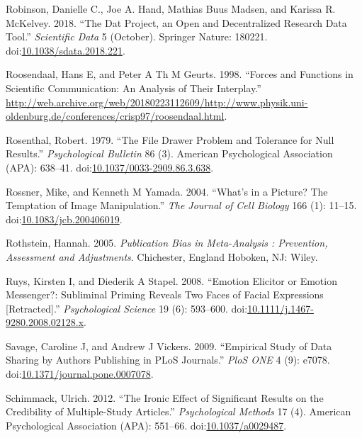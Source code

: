 \documentclass[a5paper]{book}
\begin{document}
\hypertarget{ref-doi:10.1038ux2fsdata.2018.221}{}
Robinson, Danielle C., Joe A. Hand, Mathias Buus Madsen, and Karissa R.
McKelvey. 2018. ``The Dat Project, an Open and Decentralized Research
Data Tool.'' \emph{Scientific Data} 5 (October). Springer Nature:
180221.
doi:\href{https://doi.org/10.1038/sdata.2018.221}{10.1038/sdata.2018.221}.

\hypertarget{ref-roosendaal1998}{}
Roosendaal, Hans E, and Peter A Th M Geurts. 1998. ``Forces and
Functions in Scientific Communication: An Analysis of Their Interplay.''
\url{http://web.archive.org/web/20180223112609/http://www.physik.uni-oldenburg.de/conferences/crisp97/roosendaal.html}.

\hypertarget{ref-doi:10.1037ux2f0033-2909.86.3.638}{}
Rosenthal, Robert. 1979. ``The File Drawer Problem and Tolerance for
Null Results.'' \emph{Psychological Bulletin} 86 (3). American
Psychological Association (APA): 638--41.
doi:\href{https://doi.org/10.1037/0033-2909.86.3.638}{10.1037/0033-2909.86.3.638}.

\hypertarget{ref-doi:10.1083ux2fjcb.200406019}{}
Rossner, Mike, and Kenneth M Yamada. 2004. ``What's in a Picture? The
Temptation of Image Manipulation.'' \emph{The Journal of Cell Biology}
166 (1): 11--15.
doi:\href{https://doi.org/10.1083/jcb.200406019}{10.1083/jcb.200406019}.

\hypertarget{ref-isbn:9780470870150}{}
Rothstein, Hannah. 2005. \emph{Publication Bias in Meta-Analysis :
Prevention, Assessment and Adjustments}. Chichester, England Hoboken,
NJ: Wiley.

\hypertarget{ref-doi:10.1111ux2fj.1467-9280.2008.02128.x}{}
Ruys, Kirsten I, and Diederik A Stapel. 2008. ``Emotion Elicitor or
Emotion Messenger?: Subliminal Priming Reveals Two Faces of Facial
Expressions {[}Retracted{]}.'' \emph{Psychological Science} 19 (6):
593--600.
doi:\href{https://doi.org/10.1111/j.1467-9280.2008.02128.x}{10.1111/j.1467-9280.2008.02128.x}.

\hypertarget{ref-doi:10.1371ux2fjournal.pone.0007078}{}
Savage, Caroline J, and Andrew J Vickers. 2009. ``Empirical Study of
Data Sharing by Authors Publishing in PLoS Journals.'' \emph{PloS ONE} 4
(9): e7078.
doi:\href{https://doi.org/10.1371/journal.pone.0007078}{10.1371/journal.pone.0007078}.

\hypertarget{ref-doi:10.1037ux2fa0029487}{}
Schimmack, Ulrich. 2012. ``The Ironic Effect of Significant Results on
the Credibility of Multiple-Study Articles.'' \emph{Psychological
Methods} 17 (4). American Psychological Association (APA): 551--66.
doi:\href{https://doi.org/10.1037/a0029487}{10.1037/a0029487}.
\end{document}
